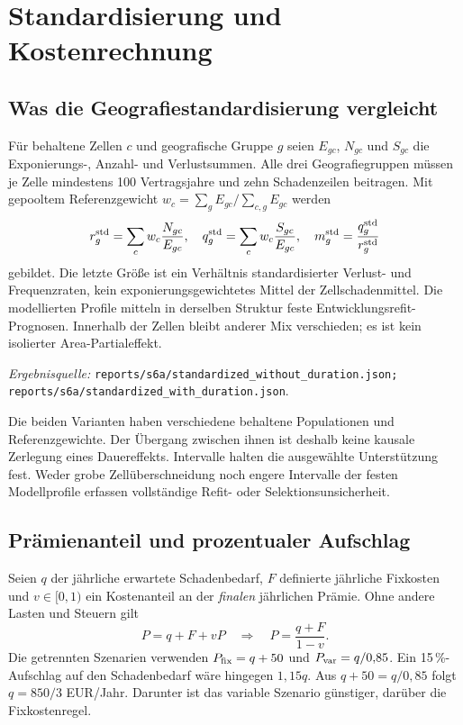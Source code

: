 \documentclass[11pt,a4paper]{article}
\newcommand{\evidence}[1]{\par{\footnotesize\textit{Ergebnisquelle:} \nolinkurl{#1}.}\par}
\begin{document}
\clearpage
\begingroup\raggedright


\endgroup

\clearpage\appendix
\section{Standardisierung und Kostenrechnung}
\subsection*{Was die Geografiestandardisierung vergleicht}
Für behaltene Zellen $c$ und geografische Gruppe $g$ seien $E_{gc}$, $N_{gc}$ und $S_{gc}$ die Exponierungs-, Anzahl- und Verlustsummen. Alle drei Geografiegruppen müssen je Zelle mindestens 100 Vertragsjahre und zehn Schadenzeilen beitragen. Mit gepooltem Referenzgewicht $w_c=\sum_gE_{gc}/\sum_{c,g}E_{gc}$ werden
\begin{equation}
 r_g^{\rm std}=\sum_cw_c\frac{N_{gc}}{E_{gc}},\quad
 q_g^{\rm std}=\sum_cw_c\frac{S_{gc}}{E_{gc}},\quad
 m_g^{\rm std}=\frac{q_g^{\rm std}}{r_g^{\rm std}}
\end{equation}
gebildet. Die letzte Größe ist ein Verhältnis standardisierter Verlust- und Frequenzraten, kein exponierungsgewichtetes Mittel der Zellschadenmittel. Die modellierten Profile mitteln in derselben Struktur feste Entwicklungsrefit-Prognosen. Innerhalb der Zellen bleibt anderer Mix verschieden; es ist kein isolierter Area-Partialeffekt.
\begin{center}\StandardTable\end{center}
\evidence{reports/s6a/standardized_without_duration.json; reports/s6a/standardized_with_duration.json}
Die beiden Varianten haben verschiedene behaltene Populationen und Referenzgewichte. Der Übergang zwischen ihnen ist deshalb keine kausale Zerlegung eines Dauereffekts. Intervalle halten die ausgewählte Unterstützung fest. Weder grobe Zellüberschneidung noch engere Intervalle der festen Modellprofile erfassen vollständige Refit- oder Selektionsunsicherheit.

\subsection*{Prämienanteil und prozentualer Aufschlag}
Seien $q$ der jährliche erwartete Schadenbedarf, $F$ definierte jährliche Fixkosten und $v\in[0,1)$ ein Kostenanteil an der \emph{finalen} jährlichen Prämie. Ohne andere Lasten und Steuern gilt
\begin{equation}
 P=q+F+vP\quad\Longrightarrow\quad P=\frac{q+F}{1-v}.
\end{equation}
Die getrennten Szenarien verwenden $P_{\rm fix}=q+50$ und $P_{\rm var}=q/0{,}85$. Ein 15\,\%-Aufschlag auf den Schadenbedarf wäre hingegen $1{,}15q$. Aus $q+50=q/0{,}85$ folgt $q=850/3$ EUR/Jahr. Darunter ist das variable Szenario günstiger, darüber die Fixkostenregel.
\end{document}
